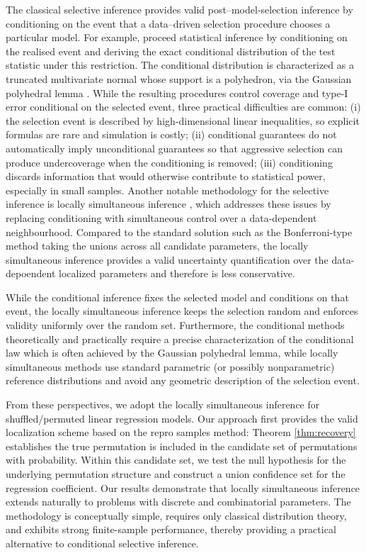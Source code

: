 \documentclass[11pt, reqno]{amsart}
\newcommand{\1}{\mbox{1}\hspace{-0.25em}\mbox{l}}
\theoremstyle{definition}\newtheorem{problem}{Problem}[section]
\theoremstyle{definition}\newtheorem{definition}[problem]{Definition}
\theoremstyle{remark}\newtheorem{assumption}{Assumption}
\theoremstyle{remark}\newtheorem{remark}[problem]{Remark}
\theoremstyle{definition}\newtheorem{example}[problem]{Example}
\theoremstyle{plain}\newtheorem{theorem}[problem]{Theorem}
\theoremstyle{plain}\newtheorem{question}[problem]{Question}
\theoremstyle{plain}\newtheorem{lemma}[problem]{Lemma}
\theoremstyle{plain}\newtheorem{proposition}[problem]{Proposition}
\theoremstyle{plain}\newtheorem{corollary}[problem]{Corollary}
\theoremstyle{plain}\newtheorem{conjecture}[problem]{Conjecture}
\begin{document}
The classical selective inference provides valid post–model‐selection inference by
conditioning on the event that a data–driven selection procedure chooses a particular model. For example, \cite{fithian2014optimal, lee2016exact, liu2018more} proceed statistical inference by conditioning on the realised event and deriving the exact conditional distribution of the test statistic under this restriction. The
conditional distribution is characterized as a truncated multivariate normal whose
support is a polyhedron, via the Gaussian polyhedral lemma \cite{lee2016exact}.
While the resulting procedures control coverage and type-I error conditional on the selected event, three practical difficulties are common: (i) the selection event is described by high-dimensional linear
      inequalities, so explicit formulas are rare and simulation is costly; (ii) conditional guarantees do not automatically imply unconditional
      guarantees so that aggressive selection can produce undercoverage when the conditioning is removed; (iii) conditioning discards information that would otherwise contribute to
      statistical power, especially in small samples.
      Another notable methodology for the selective inference is locally simultaneous inference \cite{zrnic2024locally}, 
which addresses these issues by replacing conditioning with simultaneous control over a data-dependent neighbourhood. Compared to the standard solution such as the Bonferroni-type method taking the unions across all candidate parameters, the locally simultaneous inference provides a valid uncertainty quantification over the data-depoendent localized parameters and therefore is less conservative.

While the conditional inference fixes the selected model and conditions on that event, the locally simultaneous inference keeps the selection random and enforces validity uniformly over the random set. Furthermore, the conditional methods theoretically and practically require a precise characterization of the conditional law which is often achieved by the Gaussian polyhedral lemma, while locally simultaneous methods use standard parametric (or possibly nonparametric) reference distributions and avoid any geometric description of the selection event. 

From these perspectives, we adopt the locally simultaneous inference for shuffled/permuted linear regression models. Our approach first provides the valid localization scheme based on the repro samples method: Theorem \ref{thm:recovery} establishes the true permutation is included in the candidate set of permutations with probability. Within this candidate set, we test the null hypothesis for the underlying permutation structure and construct a union confidence set for the regression coefficient. Our results demonstrate that locally simultaneous inference extends naturally to problems with discrete and combinatorial parameters.
The methodology is conceptually simple, requires only classical distribution
theory, and exhibits strong finite-sample performance, thereby providing a
practical alternative to conditional selective inference.
\end{document}
